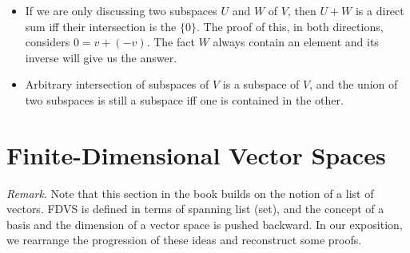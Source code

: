 \documentclass{article}
\begin{document}
\begin{itemize}
    \item If we are only discussing two subspaces $U$ and $W$ of $V$, then $U+W$ is a direct sum iff their intersection is the $\{0\}$. The proof of this, in both directions, considers $0 = v + (-v)$. The fact $W$ always contain an element and its inverse will give us the answer.
    \item Arbitrary intersection of subspaces of $V$ is a subspace of $V$, and the union of two subspaces is still a subspace iff one is contained in the other.
\end{itemize}

\section{Finite-Dimensional Vector Spaces}

\textit{Remark}. Note that this section in the book builds on the notion of a list of vectors. FDVS is defined in terms of spanning list (set), and the concept of a basis and the dimension of a vector space is pushed backward. In our exposition, we rearrange the progression of these ideas and reconstruct some proofs.
\end{document}
